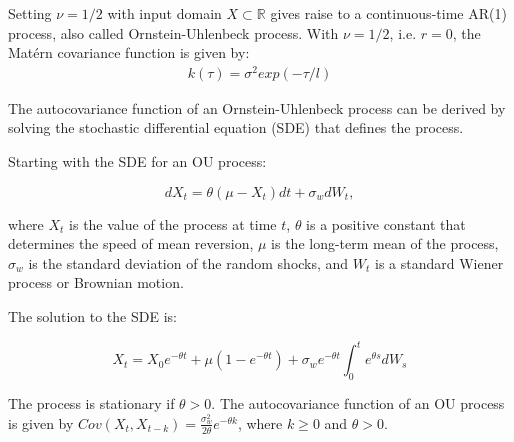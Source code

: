Setting $\nu = 1/2$ with input domain $X \subset \mathbb{R}$ gives raise to a continuous-time AR(1) process,
also called Ornstein-Uhlenbeck process.
With $\nu = 1/2$, i.e. $r=0$, the Matérn covariance function is given by:
\begin{gather}\label{kernel-matern-ar1}
    k(\tau) = \sigma^2 exp(- \tau/l)
\end{gather}

The autocovariance function of an Ornstein-Uhlenbeck process can be derived by solving the stochastic differential equation (SDE) that defines the process.

Starting with the SDE for an OU process:

$$dX_t = \theta (\mu - X_t)dt + \sigma_w dW_t,$$

where $X_t$ is the value of the process at time $t$, $\theta$ is a positive constant that determines the speed of mean reversion,
$\mu$ is the long-term mean of the process, $\sigma_w$ is the standard deviation of the random shocks, and $W_t$ is a standard Wiener process or Brownian motion.

The solution to the SDE is:

$$ X_t = X_0 e^{-\theta t} + \mu (1-e^{-\theta t}) +
\sigma_w e^{-\theta t} \int_{0}^{t} e^{\theta s} dW_s$$

%
%
%
%
%
%
%
%
%
%
%
%
%
%
The process is stationary if $\theta > 0$.
The autocovariance function of an OU process is given by
$Cov(X_t, X_{t-k}) = \frac{\sigma_w^2}{2\theta} e^{-\theta k}$,
where $k\geq 0$ and $\theta > 0$.


